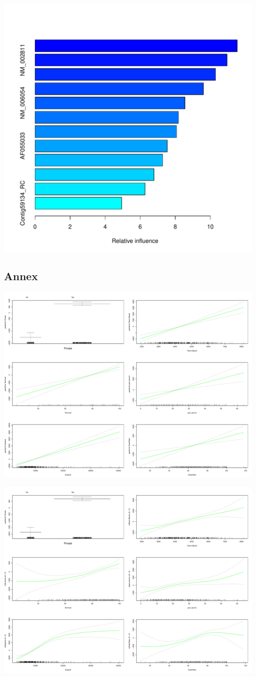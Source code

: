 \documentclass[11pt, a4paper]{article}
\begin{document}
\includegraphics[scale=0.6]{boost_data.pdf}
\subsection{Annex}
\label{sec-1-3}

\includegraphics[scale=0.4]{gam_trees_s.pdf}

\includegraphics[scale=0.4]{gam_trees_s_3.pdf}
\end{document}
